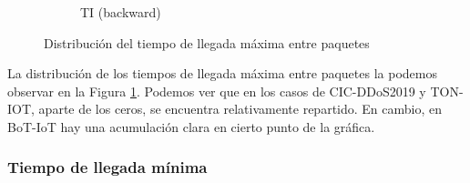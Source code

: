 \begin{figure}[H]
\begin{subfigure}[b]{0.26\textwidth}
        \caption{TI (backward)}
    \end{subfigure}
    \hfill
       \caption{Distribución del tiempo de llegada máxima entre paquetes}
       \label{fig:packet_pincer_inter_arrival_time_max}
\end{figure}

La distribución de los tiempos de llegada máxima entre paquetes la podemos observar en la Figura \ref{fig:packet_pincer_inter_arrival_time_max}. Podemos ver que en los casos de CIC-DDoS2019 y TON-IOT, aparte de los ceros, se encuentra relativamente repartido. En cambio, en BoT-IoT hay una acumulación clara en cierto punto de la gráfica.

\subsubsection{Tiempo de llegada mínima}


